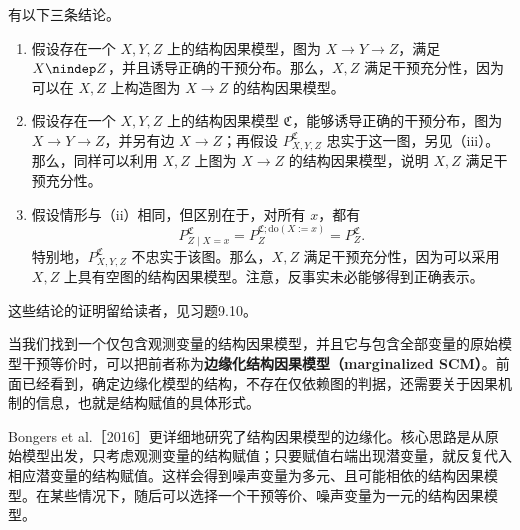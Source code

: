 \begin{remark}
有以下三条结论。
\begin{enumerate}[label=(\roman*)]
 \item 假设存在一个 $X,Y,Z$ 上的结构因果模型，图为 $X\to Y\to Z$，满足 $X\nindep Z$，并且诱导正确的干预分布。那么，$X,Z$ 满足干预充分性，因为可以在 $X,Z$ 上构造图为 $X\to Z$ 的结构因果模型。
 \item 假设存在一个 $X,Y,Z$ 上的结构因果模型 $\mathfrak C$，能够诱导正确的干预分布，图为 $X\to Y\to Z$，并另有边 $X\to Z$；再假设 $P^{\mathfrak C}_{X,Y,Z}$ 忠实于这一图，另见（iii）。那么，同样可以利用 $X,Z$ 上图为 $X\to Z$ 的结构因果模型，说明 $X,Z$ 满足干预充分性。
 \item 假设情形与（ii）相同，但区别在于，对所有 $x$，都有
 \[
  P^{\mathfrak C}_{Z\mid X=x}
  =P_Z^{\mathfrak C;\mathrm{do}(X:=x)}
  =P_Z^{\mathfrak C}.
 \]
 特别地，$P^{\mathfrak C}_{X,Y,Z}$ 不忠实于该图。那么，$X,Z$ 满足干预充分性，因为可以采用 $X,Z$ 上具有空图的结构因果模型。注意，反事实未必能够得到正确表示。
\end{enumerate}
这些结论的证明留给读者，见习题9.10。
\end{remark}

当我们找到一个仅包含观测变量的结构因果模型，并且它与包含全部变量的原始模型干预等价时，可以把前者称为\textbf{边缘化结构因果模型（marginalized SCM）}。前面已经看到，确定边缘化模型的结构，不存在仅依赖图的判据，还需要关于因果机制的信息，也就是结构赋值的具体形式。

Bongers et al.［2016］更详细地研究了结构因果模型的边缘化。核心思路是从原始模型出发，只考虑观测变量的结构赋值；只要赋值右端出现潜变量，就反复代入相应潜变量的结构赋值。这样会得到噪声变量为多元、且可能相依的结构因果模型。在某些情况下，随后可以选择一个干预等价、噪声变量为一元的结构因果模型。
